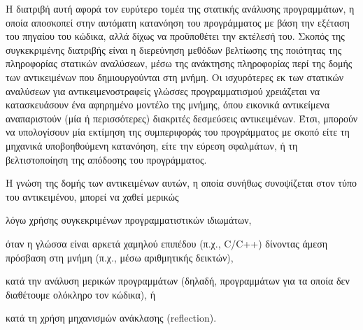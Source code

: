 


Η διατριβή αυτή αφορά τον ευρύτερο τομέα της στατικής ανάλυσης
προγραμμάτων, η οποία αποσκοπεί στην αυτόματη κατανόηση του
προγράμματος με βάση την εξέταση του πηγαίου του κώδικα, αλλά δίχως να
προϋποθέτει την εκτέλεσή του.
%
Σκοπός της συγκεκριμένης διατριβής είναι η διερεύνηση μεθόδων
βελτίωσης της ποιότητας της πληροφορίας στατικών αναλύσεων, μέσω της
ανάκτησης πληροφορίας περί της δομής των αντικειμένων που
δημιουργούνται στη μνήμη.  Οι ισχυρότερες εκ των στατικών αναλύσεων
για αντικειμενοστραφείς γλώσσες προγραμματισμού χρειάζεται να
κατασκευάσουν ένα αφηρημένο μοντέλο της μνήμης, όπου εικονικά
αντικείμενα αναπαριστούν (μία ή περισσότερες) διακριτές δεσμεύσεις
αντικειμένων.  Έτσι, μπορούν να υπολογίσουν μία εκτίμηση της
συμπεριφοράς του προγράμματος με σκοπό είτε τη μηχανικά υποβοηθούμενη
κατανόηση, είτε την εύρεση σφαλμάτων, ή τη βελτιστοποίηση της απόδοσης
του προγράμματος.

Η γνώση της δομής των αντικειμένων αυτών, η οποία συνήθως συνοψίζεται
στον τύπο του αντικειμένου, μπορεί να χαθεί μερικώς
\begin{inparaenum}[(1)]
\item λόγω χρήσης συγκεκριμένων προγραμματιστικών ιδιωμάτων,
\item όταν η γλώσσα είναι αρκετά χαμηλού επιπέδου (π.χ., {\en C/C++})
  δίνοντας άμεση πρόσβαση στη μνήμη (π.χ., μέσω αριθμητικής δεικτών),
\item κατά την ανάλυση μερικών προγραμμάτων (δηλαδή, προγραμμάτων για
  τα οποία δεν διαθέτουμε ολόκληρο τον κώδικα), ή
\item κατά τη χρήση μηχανισμών ανάκλασης ({\en reflection}).
\end{inparaenum}

